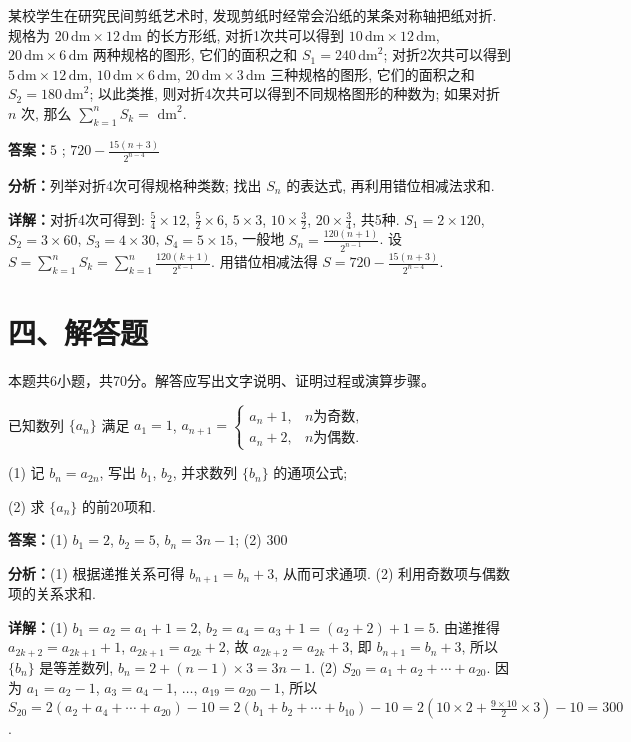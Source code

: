 \begin{question}[points=5]
某校学生在研究民间剪纸艺术时, 发现剪纸时经常会沿纸的某条对称轴把纸对折. 规格为 $20\,\text{dm} \times 12\,\text{dm}$ 的长方形纸, 对折1次共可以得到 $10\,\text{dm} \times 12\,\text{dm}$, $20\,\text{dm} \times 6\,\text{dm}$ 两种规格的图形, 它们的面积之和 $S_1 = 240\,\text{dm}^2$; 对折2次共可以得到 $5\,\text{dm} \times 12\,\text{dm}$, $10\,\text{dm} \times 6\,\text{dm}$, $20\,\text{dm} \times 3\,\text{dm}$ 三种规格的图形, 它们的面积之和 $S_2 = 180\,\text{dm}^2$; 以此类推, 则对折4次共可以得到不同规格图形的种数为; 如果对折 $n$ 次, 那么 $\sum_{k=1}^{n} S_k =$ $\text{dm}^2$.
\fillin[{$5$ ; $720 - \frac{15(n+3)}{2^{n-4}}$}]
\begin{solution}
\textbf{答案：}$5$ ; $720 - \frac{15(n+3)}{2^{n-4}}$

\textbf{分析：}列举对折4次可得规格种类数; 找出 $S_n$ 的表达式, 再利用错位相减法求和.

\textbf{详解：}对折4次可得到: $\frac{5}{4}\times12$, $\frac{5}{2}\times6$, $5\times3$, $10\times\frac{3}{2}$, $20\times\frac{3}{4}$, 共5种. $S_1=2\times120$, $S_2=3\times60$, $S_3=4\times30$, $S_4=5\times15$, 一般地 $S_n = \frac{120(n+1)}{2^{n-1}}$. 设 $S = \sum_{k=1}^n S_k = \sum_{k=1}^n \frac{120(k+1)}{2^{k-1}}$. 用错位相减法得 $S = 720 - \frac{15(n+3)}{2^{n-4}}$.
\end{solution}
\end{question}

\section*{四、解答题}
本题共6小题，共70分。解答应写出文字说明、证明过程或演算步骤。

\begin{question}[points=10]
已知数列 $\{a_n\}$ 满足 $a_1 = 1$, $a_{n+1} = \begin{cases} a_n + 1, & n \text{为奇数}, \\ a_n + 2, & n \text{为偶数}. \end{cases}$

(1) 记 $b_n = a_{2n}$, 写出 $b_1$, $b_2$, 并求数列 $\{b_n\}$ 的通项公式;

(2) 求 $\{a_n\}$ 的前20项和.
\begin{solution}
\textbf{答案：}(1) $b_1 = 2$, $b_2 = 5$, $b_n = 3n - 1$; (2) $300$

\textbf{分析：}(1) 根据递推关系可得 $b_{n+1} = b_n + 3$, 从而可求通项. (2) 利用奇数项与偶数项的关系求和.

\textbf{详解：}(1) $b_1 = a_2 = a_1 + 1 = 2$, $b_2 = a_4 = a_3 + 1 = (a_2 + 2) + 1 = 5$. 由递推得 $a_{2k+2} = a_{2k+1} + 1$, $a_{2k+1} = a_{2k} + 2$, 故 $a_{2k+2} = a_{2k} + 3$, 即 $b_{n+1} = b_n + 3$, 所以 $\{b_n\}$ 是等差数列, $b_n = 2 + (n-1)\times 3 = 3n - 1$.
(2) $S_{20} = a_1 + a_2 + \cdots + a_{20}$. 因为 $a_1 = a_2 - 1$, $a_3 = a_4 - 1$, $\ldots$, $a_{19} = a_{20} - 1$, 所以 $S_{20} = 2(a_2 + a_4 + \cdots + a_{20}) - 10 = 2(b_1 + b_2 + \cdots + b_{10}) - 10 = 2\left(10\times 2 + \frac{9\times 10}{2}\times 3\right) - 10 = 300$.
\end{solution}
\end{question}

